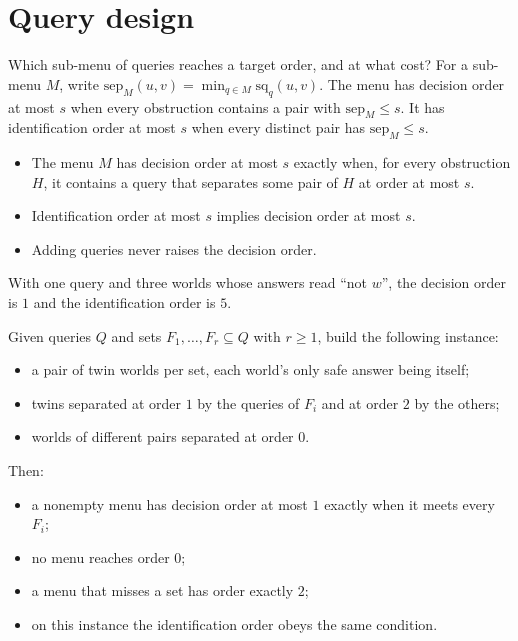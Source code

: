 \section{Query design}
\label{sec:design}

Which sub-menu of queries reaches a target order, and at what cost? For a sub-menu $M$, write
$\mathrm{sep}_M(u,v)=\min_{q\in M}\mathrm{sq}_q(u,v)$. The menu has decision order at most $s$
when every obstruction contains a pair with $\mathrm{sep}_M\le s$. It has identification order
at most $s$ when every distinct pair has $\mathrm{sep}_M\le s$.

\begin{theorem}
\label{thm:hitting}
\begin{itemize}
\item The menu $M$ has decision order at most $s$ exactly when, for every obstruction $H$, it
contains a query that separates some pair of $H$ at order at most $s$.
\item Identification order at most $s$ implies decision order at most $s$.
\item Adding queries never raises the decision order.
\end{itemize}
With one query and three worlds whose answers read ``not $w$'', the decision order is $1$ and
the identification order is $5$.
\end{theorem}

\begin{theorem}
\label{thm:hittingembed}
Given queries $Q$ and sets $F_1,\dots,F_r\subseteq Q$ with $r\ge1$, build the following
instance:
\begin{itemize}
\item a pair of twin worlds per set, each world's only safe answer being itself;
\item twins separated at order $1$ by the queries of $F_i$ and at order $2$ by the others;
\item worlds of different pairs separated at order $0$.
\end{itemize}
Then:
\begin{itemize}
\item a nonempty menu has decision order at most $1$ exactly when it meets every $F_i$;
\item no menu reaches order $0$;
\item a menu that misses a set has order exactly $2$;
\item on this instance the identification order obeys the same condition.
\end{itemize}
\end{theorem}

